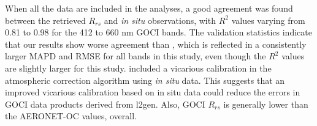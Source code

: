 \documentclass[onecolumn,3p,letterpaper,11pt]{elsarticle}
\begin{document}
When all the data are included in the analyses, a good agreement was found between the retrieved $R_{rs}$ and {\it in situ} observations, with $R^2$ values varying from 0.81 to 0.98 for the 412 to 660 nm GOCI bands. 
The validation statistics indicate that our results show worse agreement than \citet{Ahn2015}, which is reflected in a consistently larger MAPD and RMSE for all bands in this study, even though the $R^2$ values are slightly larger for this study. \citet{Ahn2015} included a vicarious calibration in the atmospheric correction algorithm using {\it in situ} data. This suggests that an improved vicarious calibration based on in situ data could reduce the errors in GOCI data products derived from l2gen. Also, GOCI $R_{rs}$ is generally lower than the AERONET-OC values, overall.
 
\end{document}
